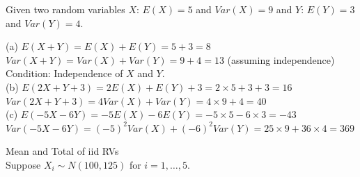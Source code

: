 \documentclass[bigtut]{tutorial}\usepackage[]{graphicx}\usepackage[]{color}
\begin{document}
\begin{tutorial}
\begin{questions}
Given two random variables $X$: $E(X)=5$ and $Var(X)=9$ and $Y$: $E(Y)=3$ and $Var(Y)=4$. \\



\begin{solution}
(a) 
$E(X+Y) = E(X) + E(Y) = 5 + 3 = 8$ \\
$Var(X+Y) = Var(X) + Var(Y) = 9 + 4 = 13$ (assuming independence) \\

Condition: Independence of $X$ and $Y$. \\

(b)
$E(2X+Y+3) = 2E(X) + E(Y) + 3 = 2 \times 5 + 3 + 3 = 16$  \\
$Var(2X+Y+3) = 4Var(X) + Var(Y) = 4 \times 9 + 4 = 40$  \\

(c)
$E(-5X-6Y) = -5E(X) - 6E(Y) = -5 \times 5 -6 \times 3 = -43$ \\
$Var(-5X-6Y) = (-5)^2Var(X) + (-6)^2 Var(Y) = 25 \times 9 + 36 \times 4 = 369$ 
\end{solution}


\question Mean and Total of iid RVs \\

Suppose $X_{i} \sim N(100, 125)$ for $i=1,\ldots,5$.

\end{questions}
\end{tutorial}
\end{document}
